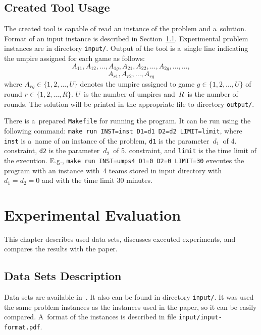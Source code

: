 \documentclass[a4paper, 10pt, twocolumn]{article}
\begin{document}
    \subsection{Created Tool Usage}

    The created tool is capable of read an instance of the problem and
    a~solution. Format of an input instance is described in
    Section~\ref{sec:datasets}. Experimental problem instances are in
    directory \texttt{input/}. Output of the tool is a~single line
    indicating the umpire assigned for each game as follows:
    $$
        A_{11}, A_{12}, \ldots, A_{1g}, A_{21}, A_{22}, \ldots, A_{2g},
        \ldots, \ldots,
    $$
    $$
        A_{r1}, A_{r2}, \ldots, A_{rg}
    $$
    where $ A_{rg} \in \{1, 2, \ldots, U\} $ denotes the umpire assigned
    to game $ g \in \{1, 2, \ldots, U\} $ of round $ r \in \{1, 2,
    \ldots, R\} $. $ U $~is the number of umpires and~$ R $~is the number
    of rounds. The solution will be printed in the appropriate file to
    directory \texttt{output/}.

    There is a~prepared \texttt{Makefile} for running the program. It can
    be run using the following command: \texttt{make run INST=inst
    D1=d1 D2=d2 LIMIT=limit}, where \texttt{inst} is a~name of an instance
    of the problem, \texttt{d1} is the parameter~$ d_1 $~of 4. constraint,
    \texttt{d2} is the parameter~$ d_2 $~of 5. constraint, and \texttt{limit}
    is the time limit of the execution. E.g., \texttt{make run INST=umps4
    D1=0 D2=0 LIMIT=30} executes the program with an instance with~4
    teams stored in input directory with $ d_1 = d_2 = 0 $ and with the
    time limit 30 minutes.


    \section{Experimental Evaluation}
    \label{sec:experiments}

    This chapter describes used data sets, discusses executed experiments,
    and compares the results with the paper.

    \subsection{Data Sets Description}
    \label{sec:datasets}

    Data sets are available in~\cite{tupOnline}. It also can be found
    in directory \texttt{input/}. It was used the same problem instances
    as the instances used in the paper, so it can be easily compared.
    A~format of the instances is described in file
    \texttt{input/input-format.pdf}.
\end{document}
